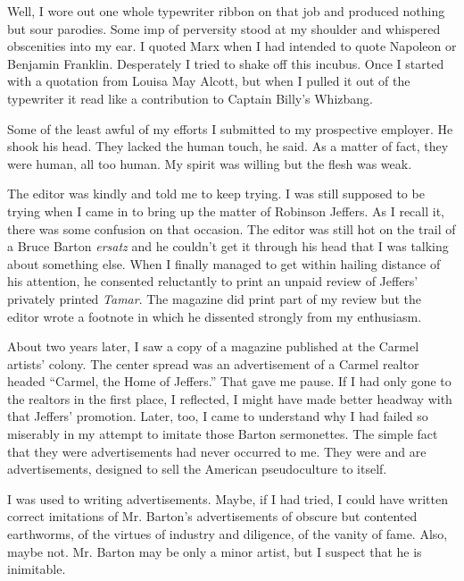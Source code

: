 \documentclass[nohyper,openany,nobib]{tufte-book}
\begin{document}
Well, I wore out one whole typewriter ribbon on that job and produced
nothing but sour parodies. Some imp of perversity stood at my shoulder
and whispered obscenities into my ear. I quoted Marx when I had intended
to quote Napoleon or Benjamin Franklin. Desperately I tried to shake off
this incubus. Once I started with a quotation from Louisa May Alcott,
but when I pulled it out of the typewriter it read like a contribution
to Captain Billy's Whizbang.

Some of the least awful of my efforts I submitted to my prospective
employer. He shook his head. They lacked the human touch, he said. As a
matter of fact, they were human, all too human. My spirit was willing
but the flesh was weak.

The editor was kindly and told me to keep trying. I was still supposed
to be trying when I came in to bring up the matter of Robinson Jeffers.
As I recall it, there was some confusion on that occasion. The editor
was still hot on the trail of a Bruce Barton \emph{ersatz} and he
couldn't get it through his head that I was talking about something
else. When I finally managed to get within hailing distance of his
attention, he consented reluctantly to print an unpaid review of
Jeffers' privately printed \emph{Tamar}. The magazine did print part of
my review but the editor wrote a footnote in which he dissented strongly
from my enthusiasm.

About two years later, I saw a copy of a magazine published at the
Carmel artists' colony. The center spread was an advertisement of a
Carmel realtor headed ``Carmel, the Home of Jeffers.'' That gave me
pause. If I had only gone to the realtors in the first place, I
reflected, I might have made better headway with that Jeffers'
promotion. Later, too, I came to understand why I had failed so
miserably in my attempt to imitate those Barton sermonettes. The simple
fact that they were advertisements had never occurred to me. They were
and are advertisements, designed to sell the American pseudoculture to
itself.

I was used to writing advertisements. Maybe, if I had tried, I could
have written correct imitations of Mr. Barton's advertisements of
obscure but contented earthworms, of the virtues of industry and
diligence, of the vanity of fame. Also, maybe not. Mr. Barton may be
only a minor artist, but I suspect that he is inimitable.
\end{document}

